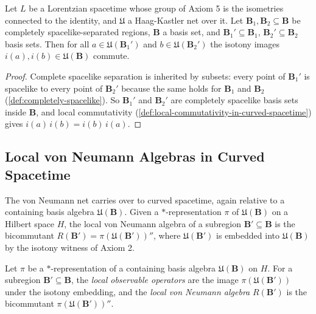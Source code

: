 \begin{lemma}
    \label{lmm:local-commutativity-mono-in-curved-spacetime}
    \leanok
    Let $L$ be a Lorentzian spacetime whose group of Axiom 5 is the isometries connected to the identity, and $\mathfrak{U}$ a Haag-Kastler net over it. Let $\mathbf{B}_1, \mathbf{B}_2 \subseteq \mathbf{B}$ be completely spacelike-separated regions, $\mathbf{B}$ a basis set, and $\mathbf{B}_1' \subseteq \mathbf{B}_1$, $\mathbf{B}_2' \subseteq \mathbf{B}_2$ basis sets. Then for all $a \in \mathfrak{U}(\mathbf{B}_1')$ and $b \in \mathfrak{U}(\mathbf{B}_2')$ the isotony images $i(a), i(b) \in \mathfrak{U}(\mathbf{B})$ commute.
\end{lemma}
\begin{proof}
    \leanok
    Complete spacelike separation is inherited by subsets: every point of $\mathbf{B}_1'$ is spacelike to every point of $\mathbf{B}_2'$ because the same holds for $\mathbf{B}_1$ and $\mathbf{B}_2$ (\ref{def:completely-spacelike}). So $\mathbf{B}_1'$ and $\mathbf{B}_2'$ are completely spacelike basis sets inside $\mathbf{B}$, and local commutativity (\ref{def:local-commutativity-in-curved-spacetime}) gives $i(a)\,i(b) = i(b)\,i(a)$.
\end{proof}

\subsection{Local von Neumann Algebras in Curved Spacetime}

The von Neumann net carries over to curved spacetime, again relative to a containing basis algebra $\mathfrak{U}(\mathbf{B})$. Given a $*$-representation $\pi$ of $\mathfrak{U}(\mathbf{B})$ on a Hilbert space $H$, the local von Neumann algebra of a subregion $\mathbf{B}' \subseteq \mathbf{B}$ is the bicommutant $R(\mathbf{B}') = \pi(\mathfrak{U}(\mathbf{B}'))''$, where $\mathfrak{U}(\mathbf{B}')$ is embedded into $\mathfrak{U}(\mathbf{B})$ by the isotony witness of Axiom 2.

\begin{definition}
    \label{def:local-von-neumann-in-curved-spacetime}
    \leanok
    Let $\pi$ be a $*$-representation of a containing basis algebra $\mathfrak{U}(\mathbf{B})$ on $H$. For a subregion $\mathbf{B}' \subseteq \mathbf{B}$, the \emph{local observable operators} are the image $\pi(\mathfrak{U}(\mathbf{B}'))$ under the isotony embedding, and the \emph{local von Neumann algebra} $R(\mathbf{B}')$ is the bicommutant $\pi(\mathfrak{U}(\mathbf{B}'))''$.
\end{definition}

